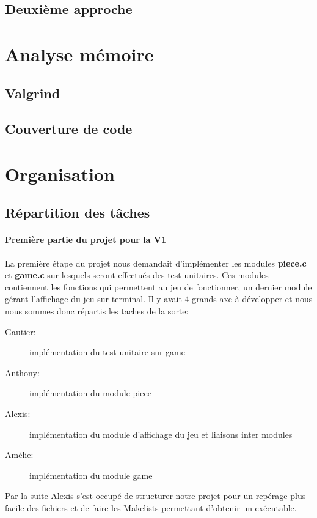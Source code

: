 \documentclass{report}
\begin{document}
\section{Deuxième approche}



\chapter{Analyse mémoire}
\setcounter{section}{0}
\section{Valgrind}

\section{Couverture de code}



\chapter{Organisation}
\setcounter{section}{0}
\section{Répartition des tâches}
\subsubsection*{Première partie du projet pour la V1}
La première étape du projet nous demandait d'implémenter les modules \textbf{piece.c} et \textbf{game.c} sur lesquels seront effectués des test unitaires. Ces modules contiennent les fonctions qui permettent au jeu de fonctionner, un dernier module gérant l'affichage du jeu sur terminal. Il y avait 4 grands axe à développer et nous nous sommes donc répartis les taches de la sorte:
\begin{description}
\item [Gautier:] implémentation du test unitaire sur game
\item [Anthony:] implémentation du module piece
\item [Alexis:] implémentation du module d'affichage du jeu et liaisons inter modules
\item [Amélie:] implémentation du module game
\end{description}
Par la suite Alexis s'est occupé de structurer notre projet pour un repérage plus facile des fichiers et de faire les Makelists permettant d'obtenir un exécutable.
\end{document}
